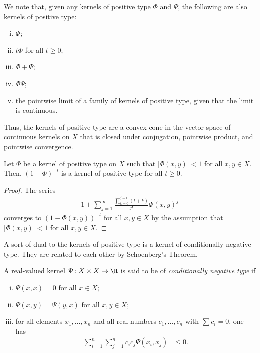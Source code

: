 \documentclass[10pt]{mypackage}
\begin{document}
We note that, given any kernels of positive type $\Phi$ and $\Psi$, the following are also kernels of positive type:
\begin{enumerate}[(i)]
  \item $ \overline{\Phi} $;
  \item $ t\Phi $ for all $t\geq 0$;
  \item $\Phi + \Psi$;
  \item $\Phi\Psi$;
  \item the pointwise limit of a family of kernels of positive type, given that the limit is continuous.
\end{enumerate}
Thus, the kernels of positive type are a convex cone in the vector space of continuous kernels on $X$ that is closed under conjugation, pointwise product, and pointwise convergence.
\begin{lemma}
  Let $\Phi$ be a kernel of positive type on $X$ such that $\left\vert \Phi\left( x,y \right) \right\vert < 1$ for all $x,y\in X$. Then, $\left( 1-\Phi \right)^{-t}$ is a kernel of positive type for all $t\geq 0$.
\end{lemma}
\begin{proof}
  The series
  \begin{align*}
    1 + \sum_{j=1}^{\infty}\frac{\prod_{k=0}^{j-1}\left( t+k \right)}{j!}\Phi\left( x,y \right)^{j}
  \end{align*}
  converges to $\left( 1-\Phi\left( x,y \right) \right)^{-t}$ for all $x,y\in X$ by the assumption that $\left\vert \Phi\left( x,y \right) \right\vert < 1$ for all $x,y\in X$.
\end{proof}
A sort of dual to the kernels of positive type is a kernel of conditionally negative type. They are related to each other by Schoenberg's Theorem.
\begin{definition}
  A real-valued kernel $\Psi\colon X\times X \to\R$ is said to be of \textit{conditionally negative type} if
  \begin{enumerate}[(i)]
    \item $\Psi\left( x,x \right) = 0$ for all $x\in X$;
    \item $\Psi\left( x,y \right) = \Psi\left( y,x \right)$ for all $x,y\in X$;
    \item for all elements $x_1,\dots,x_n$ and all real numbers $c_1,\dots,c_n$ with $\sum c_i = 0$, one has
      \begin{align*}
        \sum_{i=1}^{n}\sum_{j=1}^{n}c_ic_j\Psi\left( x_i,x_j \right) &\leq 0.
      \end{align*}
  \end{enumerate}
\end{definition}
\end{document}
